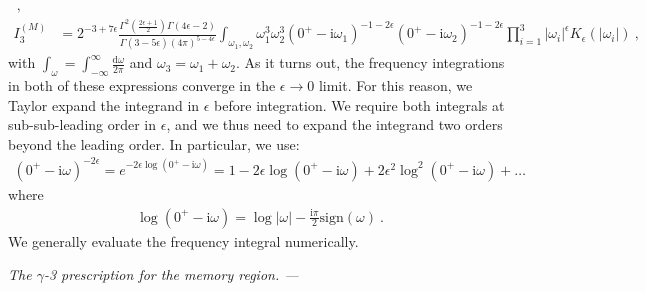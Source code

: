 \documentclass[twocolumn,superscriptaddress,amsmath, amssymb, amsfonts,preprintnumbers,aps,prd,longbibliography,nofootinbib]{revtex4-2}
\renewcommand{\sec}[1]{\textit{#1. --- }}
\renewcommand{\i}{\ensuremath{\mathrm{i}}}
\begin{document}
\begin{widetext}
\begin{align}
  \ ,
  \\
  I_3^{(M)}
  &=
  2^{-3+7\epsilon}
  \frac{
    \Gamma^2(\frac{2\epsilon+1}{2})\Gamma(4\epsilon-2)
    }{
    \Gamma(3-5\epsilon)(4\pi)^{5-4\epsilon}
  }
  \int_{\omega_1, \omega_2}
  \omega_1^3\omega_2^3
  (0^+-\i \omega_1)^{-1-2\epsilon}
  (0^+-\i \omega_2)^{-1-2\epsilon}
    \prod_{i=1}^3
  |\omega_i|^\epsilon K_\epsilon(|\omega_i|)
  \ ,
 \end{align}
with $\int_\omega = \int_{-\infty}^\infty\frac{\mathrm d\omega}{2\pi}$ and $\omega_3=\omega_1+\omega_2$.
As it turns out, the frequency integrations in both of these expressions converge in the $\epsilon\to0$ limit.
For this reason, we Taylor expand the integrand in $\epsilon$ before integration.
We require both integrals at sub-sub-leading order in $\epsilon$, and we thus need to expand the integrand two orders beyond the leading order.
In particular, we use:
\begin{align}
  (0^+-\i\omega)^{-2\epsilon}
  =
  e^{-2\epsilon \log(0^+-\i\omega)}
  =
  1
  -2\epsilon
  \log(0^+-\i\omega)
  +
  2\epsilon^2 \log^2(0^+-\i\omega)
  +
  \dots
\end{align}
where
\begin{align}
  \log(0^+-\i\omega)
  =
  \log|\omega|-\frac{\i\pi}2 \text{sign}( \omega )
  \ .
\end{align}
We generally evaluate the frequency integral numerically.

\sec{The $\gamma$-3 prescription for the memory region}
\begin{figure}[t!]
\end{figure}
\end{widetext}
\end{document}
